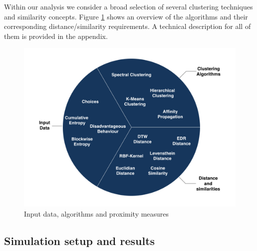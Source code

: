 \documentclass[12pt,a4paper,bibliography=totocnumbered,listof=totocnumbered]{scrartcl}
\begin{document}
Within our analysis we consider a broad selection of several clustering techniques and similarity concepts. Figure \ref{fig:cla} shows an overview of the algorithms and their corresponding distance/similarity requirements. A technical description for all of them is provided in the appendix. 
\begin{figure}[H]
	\includegraphics[width=\textwidth]{Pictures/DataClustering.jpeg}
	\caption{Input data, algorithms and proximity measures}
	\label{fig:cla}
\end{figure}

\subsection{Simulation setup and results}
\end{document}
